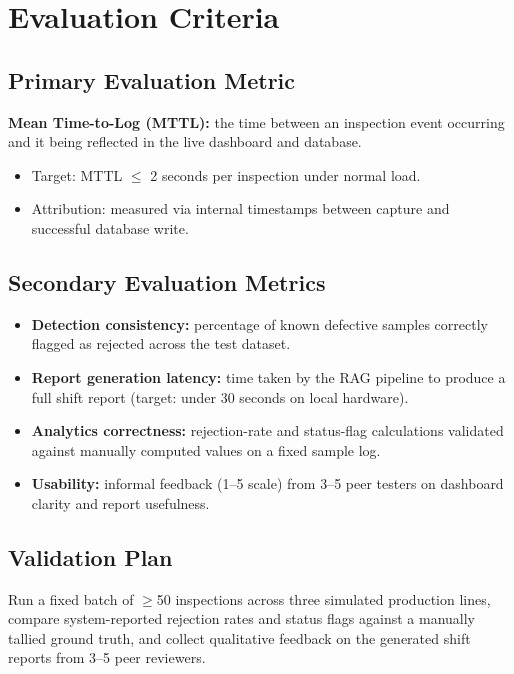 \documentclass[11pt]{article}
\begin{document}
\section{Evaluation Criteria}

\subsection{Primary Evaluation Metric}
\textbf{Mean Time-to-Log (MTTL):} the time between an inspection event occurring and it being
reflected in the live dashboard and database.
\begin{itemize}[leftmargin=*]
    \item Target: MTTL $\leq$ 2 seconds per inspection under normal load.
    \item Attribution: measured via internal timestamps between capture and successful database write.
\end{itemize}

\subsection{Secondary Evaluation Metrics}
\begin{itemize}[leftmargin=*]
    \item \textbf{Detection consistency:} percentage of known defective samples correctly flagged
    as rejected across the test dataset.
    \item \textbf{Report generation latency:} time taken by the RAG pipeline to produce a full shift
    report (target: under 30 seconds on local hardware).
    \item \textbf{Analytics correctness:} rejection-rate and status-flag calculations validated
    against manually computed values on a fixed sample log.
    \item \textbf{Usability:} informal feedback (1--5 scale) from 3--5 peer testers on dashboard
    clarity and report usefulness.
\end{itemize}

\subsection{Validation Plan}
Run a fixed batch of $\geq$50 inspections across three simulated production lines, compare
system-reported rejection rates and status flags against a manually tallied ground truth, and
collect qualitative feedback on the generated shift reports from 3--5 peer reviewers.
\end{document}
